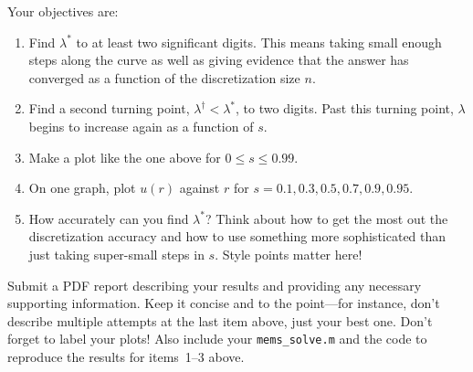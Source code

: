 \documentclass[11pt,letterpaper]{article}
\begin{document}
Your objectives are:
\begin{enumerate}
\item Find $\lambda^*$ to at least two significant digits. This means taking small enough steps along the curve as well as giving evidence that the answer has converged as a function of the discretization size $n$.
\item Find a second turning point, $\lambda^\dagger<\lambda^*$, to two digits. Past this turning point, $\lambda$ begins to increase again as a function of $s$. 
\item Make a plot like the one above for $0\le s \le 0.99$. 
\item On one graph, plot $u(r)$ against $r$ for $s=0.1,0.3,0.5,0.7,0.9,0.95$. 
\item How accurately can you find $\lambda^*$? Think about how to get the most out the discretization accuracy and how to use something more sophisticated than just taking super-small steps in $s$. Style points matter here!
\end{enumerate}

Submit a PDF report describing your results and providing any necessary supporting information. Keep it concise and to the point---for instance, don't describe multiple attempts at the last item above, just your best one. Don't forget to label your plots! Also include your \verb!mems_solve.m! and the code to reproduce the results for items~1--3 above. 
\end{document}
